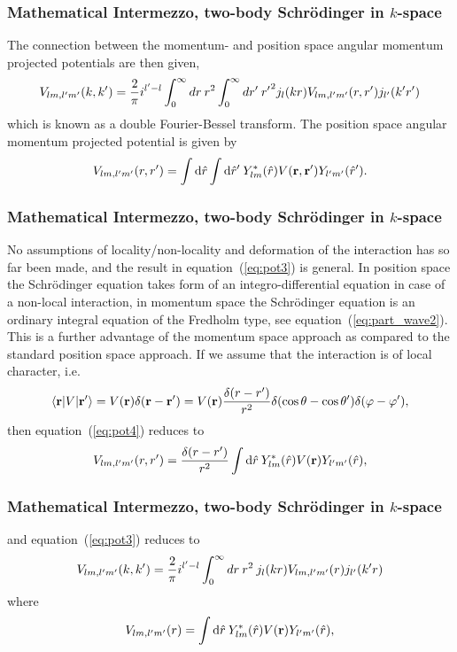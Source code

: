 \documentclass[compress]{beamer}
\begin{document}
\frame
{
\frametitle{Mathematical Intermezzo, two-body Schr\"odinger in $k$-space}
\begin{small}
{\scriptsize
The connection between the momentum- and position space angular momentum 
projected potentials are then given, 
\begin{equation}
  V_{lm, l'm'}(k,k') = {2 \over \pi} i^{l' -l}\int_0^\infty dr\: r^2 \int_0^\infty dr'\: {r'}^2 
  j_l(kr) V_{lm,l'm'}(r,r') j_{l'}(k'r')
  \label{eq:pot3}
\end{equation}
which is known as a double Fourier-Bessel transform. The position space angular 
momentum projected potential is given by
\begin{equation}
  V_{lm, l'm'}(r,r') = \int \mathrm{d}{\hat{r}} \int \mathrm{d}{\hat{r}'}\: 
  Y_{lm}^*(\hat{r})V({\bf r}, {\bf r'})Y_{l'm'}(\hat{r}').
  \label{eq:pot4}
\end{equation}
}
\end{small}
}



\frame
{
\frametitle{Mathematical Intermezzo, two-body Schr\"odinger in $k$-space}
\begin{small}
{\scriptsize
No assumptions of locality/non-locality and deformation of the interaction has so far been made, 
and the result in equation~(\ref{eq:pot3}) is general. In position space the Schr\"odinger equation 
takes form of an integro-differential equation in case of a non-local interaction, 
in momentum space the Schr\"odinger equation is an ordinary integral equation of the Fredholm type, 
see equation~(\ref{eq:part_wave2}). This is a further advantage of the momentum space approach as compared to 
the standard position space approach.  
If we assume that the 
interaction is of local character, i.e. 
\begin{equation}
  \nonumber
  \langle {\bf r}\vert V \vert {\bf r'}\rangle = V({\bf r}) \delta( {\bf r}-{\bf r}' ) = 
  V({\bf r}) {\delta( { r}-{r}' ) \over r^2} \delta ( \cos \theta - \cos \theta' ) \delta (\varphi-\varphi'), 
\end{equation}
then equation~(\ref{eq:pot4}) reduces to 
\begin{equation}
  V_{lm, l'm'}(r,r') = {\delta( { r}-{r}' ) \over r^2}\int \mathrm{d}{\hat{r}}\:
  Y_{lm}^*(\hat{r})V({\bf r})Y_{l'm'}(\hat{r}),
  \label{eq:pot5}
\end{equation}
}
\end{small}
}



\frame
{
\frametitle{Mathematical Intermezzo, two-body Schr\"odinger in $k$-space}
\begin{small}
{\scriptsize
and equation~(\ref{eq:pot3}) reduces to  
\begin{equation}
  V_{lm, l'm'}(k,k') = {2 \over \pi} i^{l' -l}\int_0^\infty dr\: r^2 \:
  j_l(kr) V_{lm,l'm'}(r) j_{l'}(k'r)
  \label{eq:pot6}
\end{equation}
where 
\begin{equation}
  V_{lm, l'm'}(r) = \int \mathrm{d}{\hat{r}}\:
  Y_{lm}^*(\hat{r})V({\bf r})Y_{l'm'}(\hat{r}),
  \label{eq:pot10}
\end{equation}
}
\end{small}
}
\end{document}
